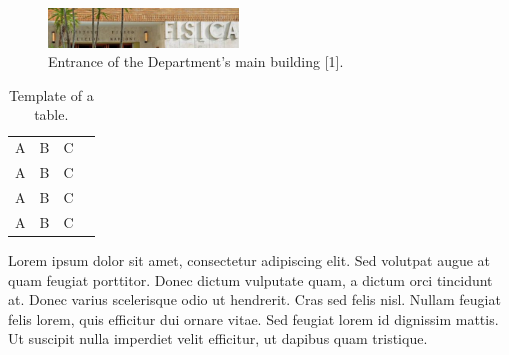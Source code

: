 \documentclass[twocolumn,twoside,10pt,nodate]{article}
\begin{document}
\begin{figure}[h]
\centering
\includegraphics[width=0.45\textwidth,angle=0]{template_fig1.pdf}
\caption{\small
Entrance of the Department's main building [1].} %
\end{figure}

\begin{table}[htbp]
	\centering
  \begin{tabular}{|c|r|r|r|} 
  \hline
          A               & B             & C                              \\
          A               & B             & C                              \\
          A               & B             & C                              \\
          A               & B             & C                              \\
  \hline
  \end{tabular}
	\caption{Template of a table.}
\end{table}	


Lorem ipsum dolor sit amet, consectetur adipiscing elit. Sed volutpat augue at quam feugiat porttitor. Donec dictum vulputate quam, a dictum orci tincidunt at. Donec varius scelerisque odio ut hendrerit. Cras sed felis nisl. Nullam feugiat felis lorem, quis efficitur dui ornare vitae. Sed feugiat lorem id dignissim mattis. Ut suscipit nulla imperdiet velit efficitur, ut dapibus quam tristique.
\end{document}
